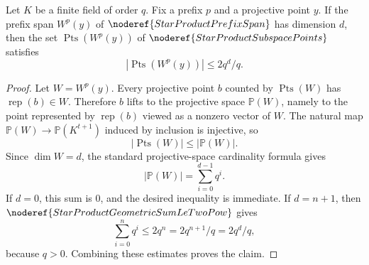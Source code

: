 \begin{helper}
Let \(K\) be a finite field of order \(q\).  Fix a prefix \(p\) and a
projective point \(y\).  If the prefix span \(W^p(y)\) of
\(\noderef{StarProductPrefixSpan}\) has dimension \(d\), then the set
\(\operatorname{Pts}(W^p(y))\) of \(\noderef{StarProductSubspacePoints}\)
satisfies
\[
  |\operatorname{Pts}(W^p(y))|\le 2q^d/q .
\]
\end{helper}
\begin{proof}
Let \(W=W^p(y)\).  Every projective point \(b\) counted by
\(\operatorname{Pts}(W)\) has \(\operatorname{rep}(b)\in W\).  Therefore
\(b\) lifts to the projective space \(\mathbb P(W)\), namely to the point
represented by \(\operatorname{rep}(b)\) viewed as a nonzero vector of \(W\).
The natural map \(\mathbb P(W)\to\mathbb P(K^{t+1})\) induced by inclusion
is injective, so
\[
  |\operatorname{Pts}(W)|\le |\mathbb P(W)|.
\]
Since \(\dim W=d\), the standard projective-space cardinality formula gives
\[
  |\mathbb P(W)|=\sum_{i=0}^{d-1}q^i .
\]
If \(d=0\), this sum is \(0\), and the desired inequality is immediate.  If
\(d=n+1\), then \(\noderef{StarProductGeometricSumLeTwoPow}\) gives
\[
  \sum_{i=0}^{n}q^i\le 2q^n=2q^{n+1}/q=2q^d/q,
\]
because \(q>0\).  Combining these estimates proves the claim.
\end{proof}
